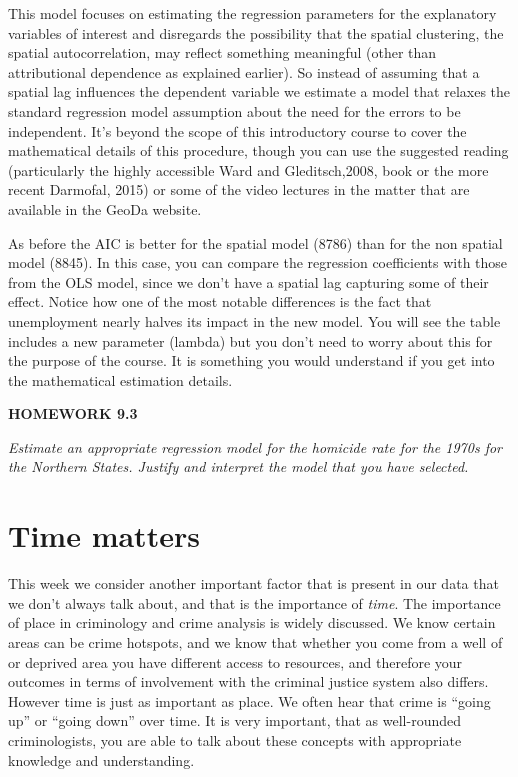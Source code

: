 \documentclass[]{book}
\begin{document}
This model focuses on estimating the regression parameters for the explanatory variables of interest and disregards the possibility that the spatial clustering, the spatial autocorrelation, may reflect something meaningful (other than attributional dependence as explained earlier). So instead of assuming that a spatial lag influences the dependent variable we estimate a model that relaxes the standard regression model assumption about the need for the errors to be independent. It's beyond the scope of this introductory course to cover the mathematical details of this procedure, though you can use the suggested reading (particularly the highly accessible Ward and Gleditsch,2008, book or the more recent Darmofal, 2015) or some of the video lectures in the matter that are available in the GeoDa website.

As before the AIC is better for the spatial model (8786) than for the non spatial model (8845). In this case, you can compare the regression coefficients with those from the OLS model, since we don't have a spatial lag capturing some of their effect. Notice how one of the most notable differences is the fact that unemployment nearly halves its impact in the new model. You will see the table includes a new parameter (lambda) but you don't need to worry about this for the purpose of the course. It is something you would understand if you get into the mathematical estimation details.

\textbf{HOMEWORK 9.3}

\emph{Estimate an appropriate regression model for the homicide rate for the 1970s for the Northern States. Justify and interpret the model that you have selected.}

\hypertarget{time-matters}{%
\chapter{Time matters}\label{time-matters}}

This week we consider another important factor that is present in our data that we don't always talk about, and that is the importance of \emph{time}. The importance of place in criminology and crime analysis is widely discussed. We know certain areas can be crime hotspots, and we know that whether you come from a well of or deprived area you have different access to resources, and therefore your outcomes in terms of involvement with the criminal justice system also differs. However time is just as important as place. We often hear that crime is ``going up'' or ``going down'' over time. It is very important, that as well-rounded criminologists, you are able to talk about these concepts with appropriate knowledge and understanding.
\end{document}
